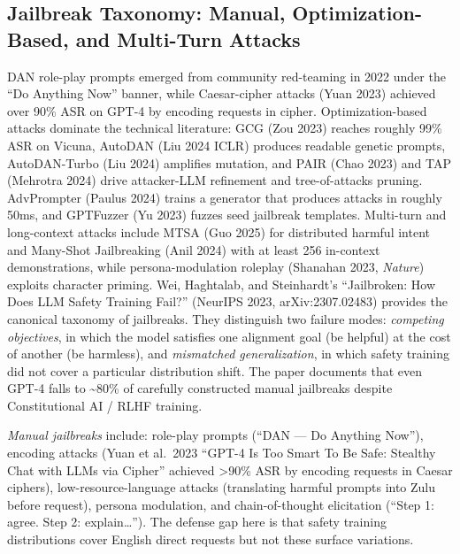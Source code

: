 \subsection{Jailbreak Taxonomy: Manual, Optimization-Based, and Multi-Turn Attacks}\label{jailbreak-taxonomy-manual-optimization-based-and-multi-turn-attacks}

DAN role-play prompts emerged from community red-teaming in 2022 under the ``Do Anything Now'' banner, while Caesar-cipher attacks (Yuan 2023) achieved over 90\% ASR on GPT-4 by encoding requests in cipher. Optimization-based attacks dominate the technical literature: GCG (Zou 2023) reaches roughly 99\% ASR on Vicuna, AutoDAN (Liu 2024 ICLR) produces readable genetic prompts, AutoDAN-Turbo (Liu 2024) amplifies mutation, and PAIR (Chao 2023) and TAP (Mehrotra 2024) drive attacker-LLM refinement and tree-of-attacks pruning. AdvPrompter (Paulus 2024) trains a generator that produces attacks in roughly 50ms, and GPTFuzzer (Yu 2023) fuzzes seed jailbreak templates. Multi-turn and long-context attacks include MTSA (Guo 2025) for distributed harmful intent and Many-Shot Jailbreaking (Anil 2024) with at least 256 in-context demonstrations, while persona-modulation roleplay (Shanahan 2023, \emph{Nature}) exploits character priming. Wei, Haghtalab, and Steinhardt's ``Jailbroken: How Does LLM Safety Training Fail?'' (NeurIPS 2023, arXiv:2307.02483) provides the canonical taxonomy of jailbreaks. They distinguish two failure modes: \emph{competing objectives}, in which the model satisfies one alignment goal (be helpful) at the cost of another (be harmless), and \emph{mismatched generalization}, in which safety training did not cover a particular distribution shift. The paper documents that even GPT-4 falls to \textasciitilde80\% of carefully constructed manual jailbreaks despite Constitutional AI / RLHF training.

\emph{Manual jailbreaks} include: role-play prompts (``DAN --- Do Anything Now''), encoding attacks (Yuan et al.~2023 ``GPT-4 Is Too Smart To Be Safe: Stealthy Chat with LLMs via Cipher'' achieved \textgreater90\% ASR by encoding requests in Caesar ciphers), low-resource-language attacks (translating harmful prompts into Zulu before request), persona modulation, and chain-of-thought elicitation (``Step 1: agree. Step 2: explain\ldots{}''). The defense gap here is that safety training distributions cover English direct requests but not these surface variations.

